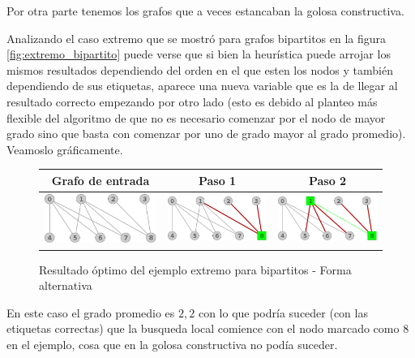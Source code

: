 Por otra parte tenemos los grafos que a veces estancaban la
golosa constructiva.

Analizando el caso extremo que se mostr\'o para grafos bipartitos
en la figura \ref{fig:extremo_bipartito} puede verse que si bien
la heur\'istica puede arrojar los mismos resultados dependiendo 
del orden en el que esten los nodos y tambi\'en dependiendo de 
sus etiquetas, aparece una nueva variable que es la de llegar al
resultado correcto empezando por otro lado (esto es debido 
al planteo m\'as flexible del algoritmo de que no es necesario
comenzar por el nodo de mayor grado sino que basta con comenzar
por uno de grado mayor al grado promedio).
Veamoslo gr\'aficamente.

\begin{figure}[H]
\caption{Resultado \'optimo del ejemplo extremo para bipartitos - 
Forma alternativa}
\begin{center}
		\begin{tabular}{|c||c||c|}
		\hline
		Grafo de entrada & Paso 1 & Paso 2 \\ 
			\hline
			\includegraphics[scale = 0.2]{img/ej3/busqueda_local/k5,4Nocompleto_st0.png} &
			\includegraphics[scale = 0.2]{img/ej3/busqueda_local/k5,4Nocompleto_st1.png} & 
			\includegraphics[scale = 0.2]{img/ej3/busqueda_local/k5,4Nocompleto_st2.png} \\
		\hline
		\end{tabular}
	\end{center}
\end{figure}
En este caso el grado promedio es $2,2$ con lo que podr\'ia suceder 
(con las etiquetas correctas) que la busqueda local comience con el
nodo marcado como $8$ en el ejemplo, cosa que en la golosa 
constructiva no pod\'ia suceder.

